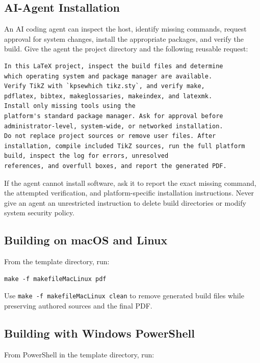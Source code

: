 \subsection{AI-Agent Installation}
\label{Section:AIAgentInstallation}

An AI coding agent can inspect the host, identify missing commands, request
approval for system changes, install the appropriate packages, and verify the
build. Give the agent the project directory and the following reusable request:

\begin{verbatim}
In this LaTeX project, inspect the build files and determine
which operating system and package manager are available.
Verify TikZ with `kpsewhich tikz.sty`, and verify make,
pdflatex, bibtex, makeglossaries, makeindex, and latexmk.
Install only missing tools using the
platform's standard package manager. Ask for approval before
administrator-level, system-wide, or networked installation.
Do not replace project sources or remove user files. After
installation, compile included TikZ sources, run the full platform
build, inspect the log for errors, unresolved
references, and overfull boxes, and report the generated PDF.
\end{verbatim}

If the agent cannot install software, ask it to report the exact missing
command, the attempted verification, and platform-specific installation
instructions. Never give an agent an unrestricted instruction to delete build
directories or modify system security policy.

\subsection{Building on macOS and Linux}

From the template directory, run:

\begin{verbatim}
make -f makefileMacLinux pdf
\end{verbatim}

Use \texttt{make -f makefileMacLinux clean} to remove generated build files while preserving authored sources and the final PDF.

\subsection{Building with Windows PowerShell}

From PowerShell in the template directory, run:

